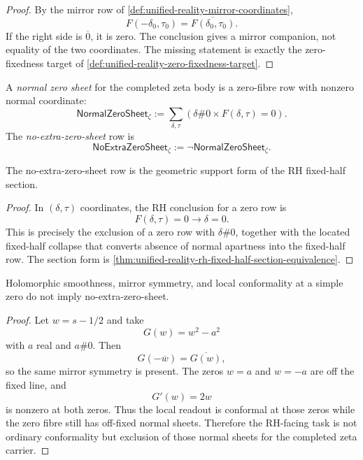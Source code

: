 \begin{proof}
By the mirror row of
\autoref{def:unified-reality-mirror-coordinates},
$$
F(-\delta_0,\tau_0)
=
\overline{F(\delta_0,\tau_0)}.
$$
If the right side is $\overline{0}$, it is zero.  The conclusion gives a
mirror companion, not equality of the two coordinates.  The missing
statement is exactly the zero-fixedness target of
\autoref{def:unified-reality-zero-fixedness-target}.
\end{proof}

\begin{definition}
\label{def:unified-reality-normal-zero-sheet}
A \emph{normal zero sheet} for the completed zeta body is a zero-fibre
row with nonzero normal coordinate:
$$
\mathsf{NormalZeroSheet}_{\zeta}
:=
\sum_{\delta,\tau}
\left(
\delta\#0
\times
F(\delta,\tau)=0
\right).
$$
The \emph{no-extra-zero-sheet} row is
$$
\mathsf{NoExtraZeroSheet}_{\zeta}
:=
\neg\mathsf{NormalZeroSheet}_{\zeta}.
$$
\end{definition}

\begin{theorem}
\label{thm:unified-reality-no-extra-zero-sheet-rh-support-form}
The no-extra-zero-sheet row is the geometric support form of the RH
fixed-half section.
\end{theorem}

\begin{proof}
In $(\delta,\tau)$ coordinates, the RH conclusion for a zero row is
$$
F(\delta,\tau)=0\to\delta=0.
$$
This is precisely the exclusion of a zero row with $\delta\#0$, together
with the located fixed-half collapse that converts absence of normal
apartness into the fixed-half row.  The section form is
\autoref{thm:unified-reality-rh-fixed-half-section-equivalence}.
\end{proof}

\begin{principle}
\label{prin:unified-reality-local-conformality-not-zero-fibre-rigidity}
Holomorphic smoothness, mirror symmetry, and local conformality at a
simple zero do not imply no-extra-zero-sheet.
\end{principle}

\begin{proof}
Let $w=s-1/2$ and take
$$
G(w)=w^2-a^2
$$
with $a$ real and $a\#0$.  Then
$$
G(-\overline w)=\overline{G(w)},
$$
so the same mirror symmetry is present.  The zeros $w=a$ and $w=-a$
are off the fixed line, and
$$
G'(w)=2w
$$
is nonzero at both zeros.  Thus the local readout is conformal at those
zeros while the zero fibre still has off-fixed normal sheets.  Therefore
the RH-facing task is not ordinary conformality but exclusion of those
normal sheets for the completed zeta carrier.
\end{proof}

